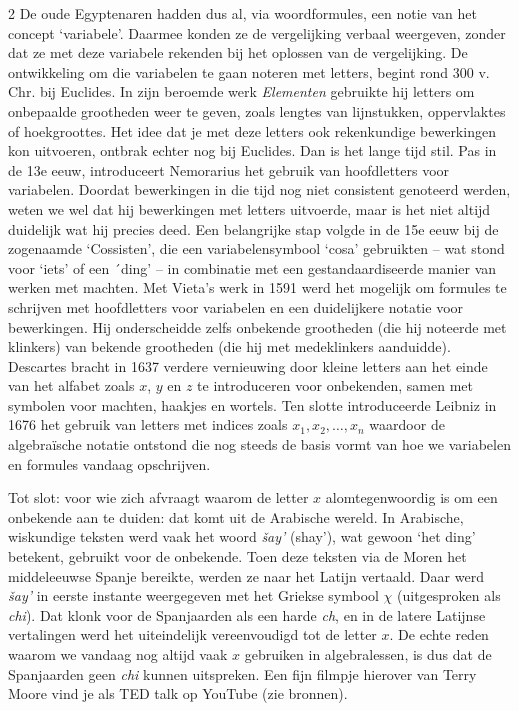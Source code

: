 \begin{multicols}{2}
De oude Egyptenaren hadden dus al, via woordformules, een notie van het concept `variabele'. Daarmee konden ze de vergelijking verbaal weergeven, zonder dat ze met deze variabele rekenden bij het oplossen van de vergelijking. De ontwikkeling om die variabelen te gaan noteren met letters, begint rond 300 v.\,Chr. bij Euclides. In zijn beroemde werk \textit{Elementen} gebruikte hij letters om onbepaalde grootheden weer te geven, zoals lengtes van lijnstukken, oppervlaktes of hoekgroottes. Het idee dat je met deze letters ook rekenkundige bewerkingen kon uitvoeren, ontbrak echter nog bij Euclides. Dan is het lange tijd stil. Pas in de 13e eeuw, introduceert Nemorarius het gebruik van hoofdletters voor variabelen. Doordat bewerkingen in die tijd nog niet consistent genoteerd werden, weten we wel dat hij bewerkingen met letters uitvoerde, maar is het niet altijd duidelijk wat hij precies deed.  Een belangrijke stap volgde in de 15e eeuw bij de zogenaamde ‘Cossisten’, die een variabelensymbool `cosa' gebruikten -- wat stond voor `iets' of een ´ding' -- in combinatie met een gestandaardiseerde manier van werken met machten. Met Vieta’s werk in 1591 werd het mogelijk om formules te schrijven met hoofdletters voor variabelen en een duidelijkere notatie voor bewerkingen. Hij onderscheidde zelfs onbekende grootheden (die hij noteerde met klinkers) van bekende grootheden (die hij met medeklinkers aanduidde). Descartes bracht in 1637 verdere vernieuwing door kleine letters aan het einde van het alfabet zoals $x$, $y$ en $z$ te introduceren voor onbekenden, samen met symbolen voor machten, haakjes en wortels. Ten slotte introduceerde Leibniz in 1676 het gebruik van letters met indices zoals $x_1,x_2,\ldots,x_n$ waardoor de algebraïsche notatie ontstond die nog steeds de basis vormt van hoe we variabelen en formules vandaag opschrijven.

Tot slot: voor wie zich afvraagt waarom de letter $x$ alomtegenwoordig is om een onbekende aan te duiden: dat komt uit de Arabische wereld. In Arabische, wiskundige teksten werd vaak het woord \emph{šay’} (shay'), wat gewoon `het ding' betekent, gebruikt voor de onbekende. Toen deze teksten via de Moren het middeleeuwse Spanje bereikte, werden ze naar het Latijn vertaald. Daar werd \emph{šay’} in eerste instante weergegeven met het Griekse symbool $\chi$ (uitgesproken als \emph{chi}). Dat klonk voor de Spanjaarden als een harde \emph{ch}, en in de latere Latijnse vertalingen werd het uiteindelijk vereenvoudigd tot de letter $x$. De echte reden waarom we vandaag nog altijd vaak $x$ gebruiken in algebralessen, is dus dat de Spanjaarden geen \textit{chi} kunnen uitspreken. Een fijn filmpje hierover van Terry Moore vind je als TED talk op YouTube (zie bronnen).



\end{multicols}

